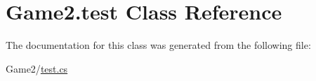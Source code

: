 \hypertarget{class_game2_1_1test}{}\section{Game2.\+test Class Reference}
\label{class_game2_1_1test}


The documentation for this class was generated from the following file\+:\begin{DoxyCompactItemize}
\item 
Game2/\mbox{\hyperlink{test_8cs}{test.\+cs}}\end{DoxyCompactItemize}
